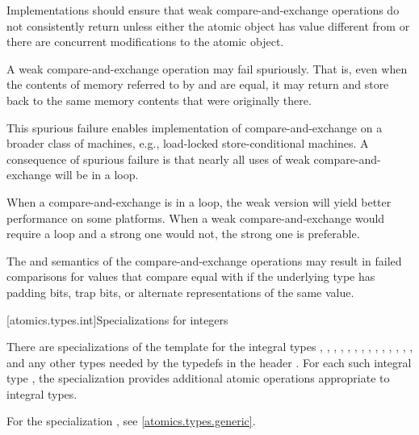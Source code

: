 \begin{itemdescr}
\pnum
Implementations should ensure that weak compare-and-exchange operations do not
consistently return  unless either the atomic object has value
different from  or there are concurrent modifications to the
atomic object.

\pnum
\remarks
A weak compare-and-exchange operation may fail spuriously. That is, even when
the contents of memory referred to by  and  are
equal, it may return  and store back to  the same memory
contents that were originally there.
\begin{note} This
spurious failure enables implementation of compare-and-exchange on a broader class of
machines, e.g., load-locked store-conditional machines. A
consequence of spurious failure is that nearly all uses of weak compare-and-exchange
will be in a loop.

When a compare-and-exchange is in a loop, the weak version will yield better performance
on some platforms. When a weak compare-and-exchange would require a loop and a strong one
would not, the strong one is preferable.
\end{note}

\pnum
\begin{note} The  and  semantics of the compare-and-exchange
operations may result in failed comparisons for values that compare equal with
 if the underlying type has padding bits, trap bits, or alternate
representations of the same value.\end{note}
\end{itemdescr}

[atomics.types.int]{Specializations for integers}

%
\pnum
There are specializations of the 
template for the integral types
,
,
,
,
,
,
,
,
,
,
,
,
,
,
and any other types needed by the typedefs in the header .
For each such integral type , the specialization
 provides additional atomic operations appropriate to integral types.
\begin{note}
For the specialization , see \ref{atomics.types.generic}.
\end{note}

